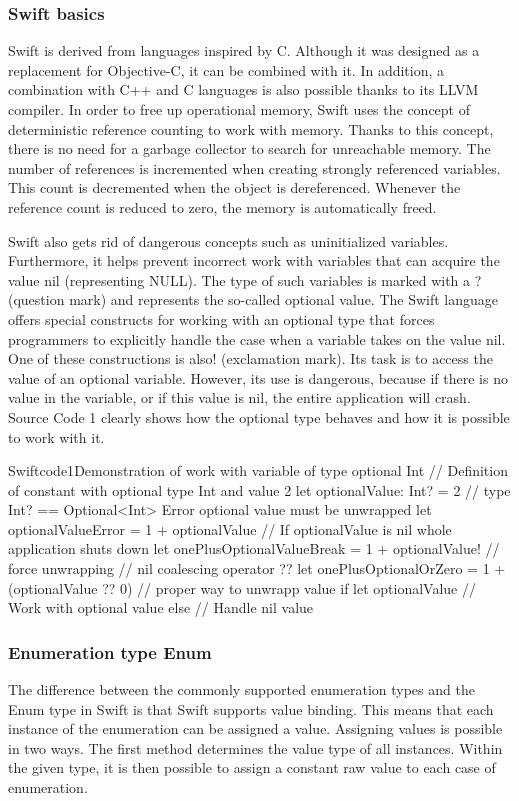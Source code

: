 \documentclass[
  biblatex,
  language=english,
  figures=false,
  sourcecodes,
  glossaries,
  index
]{kidiplom}
\begin{document}
\subsubsection{Swift basics}
Swift is derived from languages inspired by C. Although it was designed as a replacement for Objective-C, it can be combined with it. In addition, a combination with C++ and C languages is also possible thanks to its LLVM compiler. In order to free up operational memory, Swift uses the concept of deterministic reference counting to work with memory. Thanks to this concept, there is no need for a garbage collector to search for unreachable memory. The number of references is incremented when creating strongly referenced variables. This count is decremented when the object is dereferenced. Whenever the reference count is reduced to zero, the memory is automatically freed.

Swift also gets rid of dangerous concepts such as uninitialized variables. Furthermore, it helps prevent incorrect work with variables that can acquire the value nil (representing NULL). The type of such variables is marked with a ? (question mark) and represents the so-called optional value. The Swift language offers special constructs for working with an optional type that forces programmers to explicitly handle the case when a variable takes on the value nil. One of these constructions is also! (exclamation mark). Its task is to access the value of an optional variable. However, its use is dangerous, because if there is no value in the variable, or if this value is nil, the entire application will crash. Source Code 1 clearly shows how the optional type behaves and how it is possible to work with it.

\begin{kicode}{Swift}{code1}{Demonstration of work with variable of type optional Int}
// Definition of constant with optional type Int and value 2
let optionalValue: Int? = 2 // type Int? == Optional<Int>
Error optional value must be unwrapped
let optionalValueError = 1 + optionalValue
// If optionalValue is nil whole application shuts down
let onePlusOptionalValueBreak = 1 + optionalValue! // force unwrapping
// nil coalescing operator ??
let onePlusOptionalOrZero = 1 + (optionalValue ?? 0)
// proper way to unwrapp value
if let optionalValue {
// Work with optional value
} else {
// Handle nil value
}
\end{kicode}

\subsubsection{Enumeration type Enum}
The difference between the commonly supported enumeration types and the Enum type in Swift is that Swift supports value binding. This means that each instance of the enumeration can be assigned a value. Assigning values is possible in two ways. The first method determines the value type of all instances. Within the given type, it is then possible to assign a constant raw value to each case of enumeration.
\end{document}
